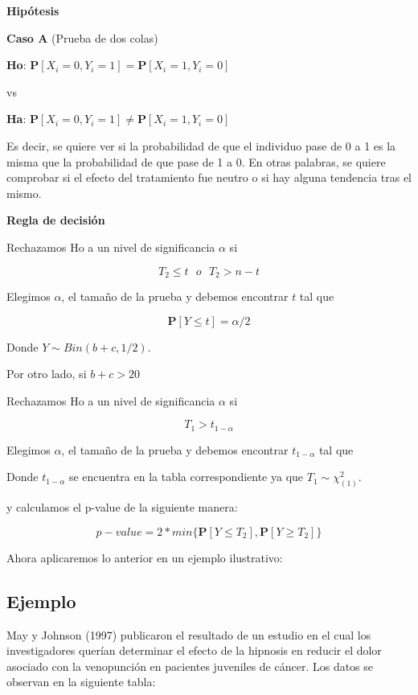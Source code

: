 \documentclass[a4paper,oneside,openany]{book}
\begin{document}
\textbf{Hipótesis}

\textbf{Caso A} (Prueba de dos colas)

\textbf{Ho}:
\(\mathbf{P}[X_{i}=0,Y_{i}=1]= \mathbf{P}[X_{i}=1,Y_{i}=0]\)

vs

\textbf{Ha}:
\(\mathbf{P}[X_{i}=0,Y_{i}=1]\neq \mathbf{P}[X_{i}=1,Y_{i}=0]\)

Es decir, se quiere ver si la probabilidad de que el individuo pase de 0
a 1 es la misma que la probabilidad de que pase de 1 a 0. En otras
palabras, se quiere comprobar si el efecto del tratamiento fue neutro o
si hay alguna tendencia tras el mismo.

\textbf{Regla de decisión}

Rechazamos Ho a un nivel de significancia \(\alpha\) si

\[T_{2} \leq t \ \ \   o \ \ \ T_{2}>n-t\]

Elegimos \(\alpha\), el tamaño de la prueba y debemos encontrar \(t\)
tal que

\[\mathbf{P}[Y \leq t]=\alpha/2\]

Donde \(Y \sim Bin (b+c,1/2)\).

Por otro lado, si \(b+c>20\)

Rechazamos Ho a un nivel de significancia \(\alpha\) si

\[T_{1} > t_{1-\alpha}\]

Elegimos \(\alpha\), el tamaño de la prueba y debemos encontrar
\(t_{1-\alpha}\) tal que

Donde \(t_{1-\alpha}\) se encuentra en la tabla correspondiente ya que
\(T_{1} \sim \chi^{2}_{(1)}\).

y calculamos el p-value de la siguiente manera:

\[p-value=2*min\{\mathbf{P}[Y\leq T_{2}],\mathbf{P}[Y\geq T_{2}]\}\]

Ahora aplicaremos lo anterior en un ejemplo ilustrativo:

\subsection{Ejemplo}\label{ejemplo-3}

May y Johnson (1997) publicaron el resultado de un estudio en el cual
los investigadores querían determinar el efecto de la hipnosis en
reducir el dolor asociado con la venopunción en pacientes juveniles de
cáncer. Los datos se observan en la siguiente tabla:
\end{document}
